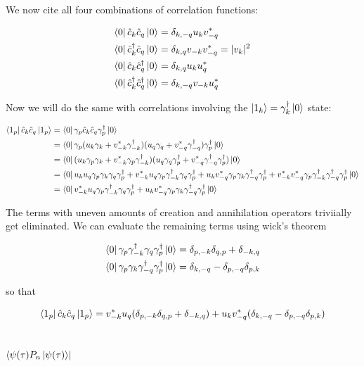 \documentclass{article}
\begin{document}
We now cite all four combinations of correlation functions:

\begin{align}
\bra{0} \hat{c}_k \hat{c}_q \ket{0} &= \delta_{k,-q} u_k v^*_{-q} \\
\bra{0} \hat{c}^\dagger_k \hat{c}_q \ket{0} &= \delta_{k,q} v_{-k} v^*_{-q}  = |v_k|^2\\
\bra{0} \hat{c}_k \hat{c}^\dagger_q \ket{0} &= \delta_{k,q} u_{k} u^*_{q} \\
\bra{0} \hat{c}^\dagger_k \hat{c}^\dagger_q \ket{0} &= \delta_{k,-q} v_{-k} u^*_{q}
\end{align}


Now we will do the same with correlations involving the $\ket{1_k} = \gamma^\dagger_k \ket{0}$ state:

\begin{align}
    \bra{1_p} \hat{c}_k \hat{c}_q \ket{1_p} &= \bra{0} \gamma_p  \hat{c}_k \hat{c}_q \gamma^\dagger_{p} \ket{0}
    \\
    &= \bra{0} \gamma_{p} (u_k \gamma_k + v^*_{-k} \gamma^\dagger_{-k}) (u_q \gamma_q + v^*_{-q} \gamma^\dagger_{-q}) \gamma^\dagger_{p} \ket{0} \\
    &= \bra{0} (u_k \gamma_p \gamma_k + v^*_{-k} \gamma_p \gamma^\dagger_{-k}  ) (u_q \gamma_q \gamma^\dagger_{p} + v^*_{-q} \gamma^\dagger_{-q} \gamma^\dagger_p ) \ket{0}
    \\&= \bra{0} u_k u_q \gamma_p \gamma_k \gamma_q \gamma^\dagger_p + v^*_{-k} u_q \gamma_p \gamma^\dagger_{-k} \gamma_q \gamma^\dagger_p  + u_k v^*_{-q} \gamma_p \gamma_k \gamma^\dagger_{-q} \gamma^\dagger_{p} + v^*_{-k} v^*_{-q} \gamma_p \gamma^\dagger_{-k} \gamma^\dagger_{-q} \gamma^\dagger_{p}         \ket{0}
    \\ &= \bra{0} v^*_{-k} u_q \gamma_p \gamma^\dagger_{-k} \gamma_q \gamma^\dagger_p  + u_k v^*_{-q} \gamma_p \gamma_k \gamma^\dagger_{-q} \gamma^\dagger_{p}     \ket{0}
\end{align}

The terms with uneven amounts of creation and annihilation operators triviially get eliminated. We can evaluate the remaining terms using wick's theorem

\begin{align}
    \bra{0} \gamma_p \gamma^\dagger_{-k} \gamma_q \gamma^\dagger_p \ket{0} &= \delta_{p,-k} \delta_{q,p} + \delta_{-k,q} \\
    \bra{0} \gamma_p \gamma_{k} \gamma^\dagger_{-q} \gamma^\dagger_p \ket{0} &= \delta_{k,-q}- \delta_{p,-q}\delta_{p,k}
\end{align}

so that 

\begin{equation}
    \bra{1_p} \hat{c}_k \hat{c}_q \ket{1_p} = v^*_{-k}u_q (\delta_{p,-k} \delta_{q,p} + \delta_{-k,q})+u_k v^*_{-q} (\delta_{k,-q}- \delta_{p,-q}\delta_{p,k})
\end{equation}

\subsection{$\bra{\psi(\tau) P_n \ket{\psi(\tau)}}$}
\end{document}
